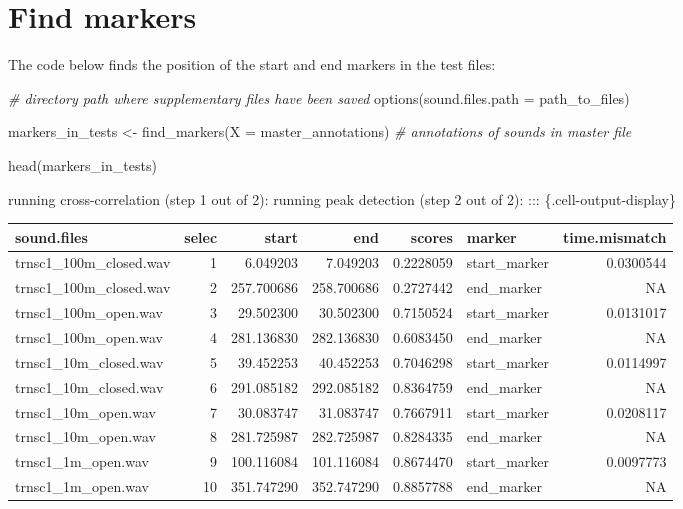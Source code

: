 \documentclass[
  letterpaper,
  DIV=11,
  numbers=noendperiod]{scrartcl}
\newenvironment{Shaded}{\begin{snugshade}}{\end{snugshade}}
\newcommand{\AttributeTok}[1]{\textcolor[rgb]{0.49,0.56,0.16}{#1}}
\newcommand{\CommentTok}[1]{\textcolor[rgb]{0.38,0.63,0.69}{\textit{#1}}}
\newcommand{\FunctionTok}[1]{\textcolor[rgb]{0.02,0.16,0.49}{#1}}
\newcommand{\NormalTok}[1]{\textcolor[rgb]{0.00,0.44,0.13}{#1}}
\newcommand{\OtherTok}[1]{\textcolor[rgb]{0.00,0.44,0.13}{#1}}
\begin{document}
\hypertarget{find-markers}{%
\section{Find markers}\label{find-markers}}

The code below finds the position of the start and end markers in the
test files:

\begin{Shaded}
\begin{Highlighting}[numbers=left,,]
\CommentTok{\# directory path where supplementary files have been saved}
\FunctionTok{options}\NormalTok{(}\AttributeTok{sound.files.path =}\NormalTok{ path\_to\_files)}

\NormalTok{markers\_in\_tests }\OtherTok{\textless{}{-}} \FunctionTok{find\_markers}\NormalTok{(}\AttributeTok{X =}\NormalTok{ master\_annotations)  }\CommentTok{\# annotations of sounds in master file}

\FunctionTok{head}\NormalTok{(markers\_in\_tests)}
\end{Highlighting}
\end{Shaded}

running cross-correlation (step 1 out of 2): running peak detection
(step 2 out of 2): ::: \{.cell-output-display\}

\begin{landscape}
\begin{longtable*}[t]{lrrrrlr}
\toprule
sound.files & selec & start & end & scores & marker & time.mismatch\\
\midrule
trnsc1\_100m\_closed.wav & 1 & 6.049203 & 7.049203 & 0.2228059 & start\_marker & 0.0300544\\
trnsc1\_100m\_closed.wav & 2 & 257.700686 & 258.700686 & 0.2727442 & end\_marker & NA\\
trnsc1\_100m\_open.wav & 3 & 29.502300 & 30.502300 & 0.7150524 & start\_marker & 0.0131017\\
trnsc1\_100m\_open.wav & 4 & 281.136830 & 282.136830 & 0.6083450 & end\_marker & NA\\
trnsc1\_10m\_closed.wav & 5 & 39.452253 & 40.452253 & 0.7046298 & start\_marker & 0.0114997\\
\addlinespace
trnsc1\_10m\_closed.wav & 6 & 291.085182 & 292.085182 & 0.8364759 & end\_marker & NA\\
trnsc1\_10m\_open.wav & 7 & 30.083747 & 31.083747 & 0.7667911 & start\_marker & 0.0208117\\
trnsc1\_10m\_open.wav & 8 & 281.725987 & 282.725987 & 0.8284335 & end\_marker & NA\\
trnsc1\_1m\_open.wav & 9 & 100.116084 & 101.116084 & 0.8674470 & start\_marker & 0.0097773\\
trnsc1\_1m\_open.wav & 10 & 351.747290 & 352.747290 & 0.8857788 & end\_marker & NA\\
\bottomrule
\end{longtable*}
\end{landscape}
\end{document}
